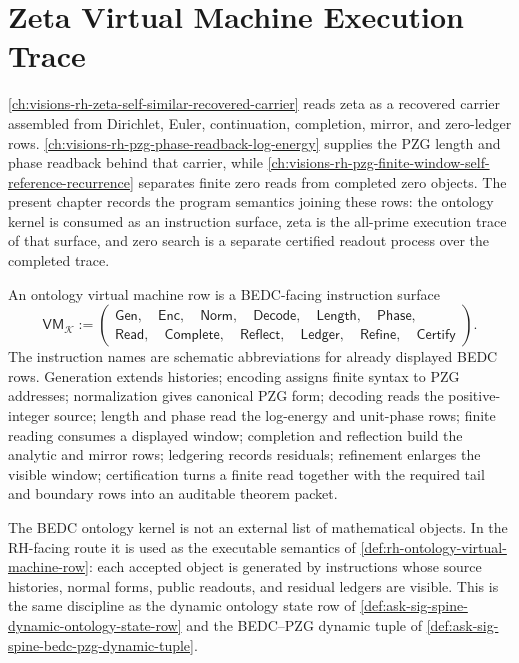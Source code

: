 \chapter{Zeta Virtual Machine Execution Trace}
\label{ch:visions-rh-zeta-virtual-machine-execution-trace}

\autoref{ch:visions-rh-zeta-self-similar-recovered-carrier} reads zeta
as a recovered carrier assembled from Dirichlet, Euler, continuation,
completion, mirror, and zero-ledger rows.
\autoref{ch:visions-rh-pzg-phase-readback-log-energy} supplies the PZG
length and phase readback behind that carrier, while
\autoref{ch:visions-rh-pzg-finite-window-self-reference-recurrence}
separates finite zero reads from completed zero objects.  The present
chapter records the program semantics joining these rows: the ontology
kernel is consumed as an instruction surface, zeta is the all-prime
execution trace of that surface, and zero search is a separate certified
readout process over the completed trace.

\begin{definition}
\label{def:rh-ontology-virtual-machine-row}
An ontology virtual machine row is a BEDC-facing instruction surface
$$
\mathsf{VM}_{\mathcal K}
:=
\left(
\begin{gathered}
\mathsf{Gen},\quad
\mathsf{Enc},\quad
\mathsf{Norm},\quad
\mathsf{Decode},\quad
\mathsf{Length},\quad
\mathsf{Phase},\\
\mathsf{Read},\quad
\mathsf{Complete},\quad
\mathsf{Reflect},\quad
\mathsf{Ledger},\quad
\mathsf{Refine},\quad
\mathsf{Certify}
\end{gathered}
\right).
$$
The instruction names are schematic abbreviations for already displayed
BEDC rows.  Generation extends histories; encoding assigns finite syntax
to PZG addresses; normalization gives canonical PZG form; decoding reads
the positive-integer source; length and phase read the log-energy and
unit-phase rows; finite reading consumes a displayed window; completion
and reflection build the analytic and mirror rows; ledgering records
residuals; refinement enlarges the visible window; certification turns a
finite read together with the required tail and boundary rows into an
auditable theorem packet.
\end{definition}

\begin{principle}
\label{prin:rh-kernel-executable-semantics}
The BEDC ontology kernel is not an external list of mathematical
objects.  In the RH-facing route it is used as the executable semantics
of \autoref{def:rh-ontology-virtual-machine-row}: each accepted object
is generated by instructions whose source histories, normal forms,
public readouts, and residual ledgers are visible.  This is the same
discipline as the dynamic ontology state row of
\autoref{def:ask-sig-spine-dynamic-ontology-state-row} and the
BEDC--PZG dynamic tuple of
\autoref{def:ask-sig-spine-bedc-pzg-dynamic-tuple}.
\end{principle}

